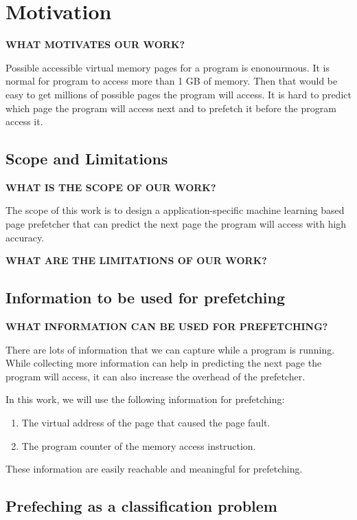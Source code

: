 
\section{Motivation}\label{sec:3}

\textbf{WHAT MOTIVATES OUR WORK?}

Possible accessible virtual memory pages for a program is enonourmous. It is normal for program to access more than 1 GB of memory. Then that would be easy to get millions of possible pages the program will access. It is hard to predict which page the program will access next and to prefetch it before the program access it.

\subsection{Scope and Limitations}

\textbf{WHAT IS THE SCOPE OF OUR WORK?}

The scope of this work is to design a application-specific machine learning based page prefetcher that can predict the next page the program will access with high accuracy.

\textbf{WHAT ARE THE LIMITATIONS OF OUR WORK?}

\subsection{Information to be used for prefetching}

\textbf{WHAT INFORMATION CAN BE USED FOR PREFETCHING?}

There are lots of information that we can capture while a program is running. While collecting more information can help in predicting the next page the program will access, it can also increase the overhead of the prefetcher.

In this work, we will use the following information for prefetching:
\begin{enumerate}
    \item The virtual address of the page that caused the page fault.
    \item The program counter of the memory access instruction.
\end{enumerate}

These information are easily reachable and meaningful for prefetching.

\subsection{Prefeching as a classification problem}

